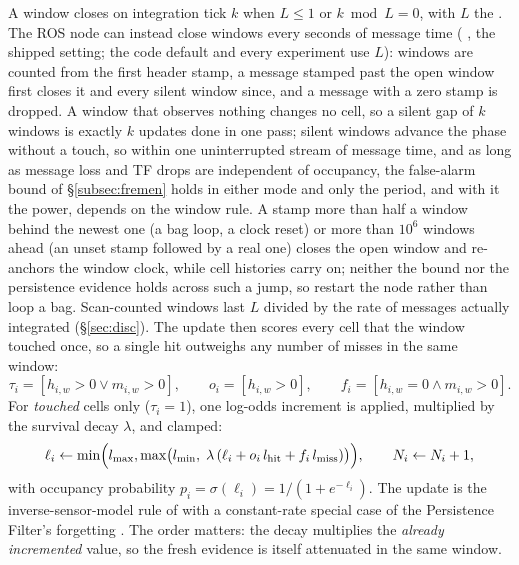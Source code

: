 A window closes on integration tick $k$ when $L\le 1$ or $k \bmod L=0$, with $L$ the . The ROS node can instead close windows every  seconds of message time ( , the shipped setting; the code default and every experiment use $L$): windows are counted from the first header stamp, a message stamped past the open window first closes it and every silent window since, and a message with a zero stamp is dropped. A window that observes nothing changes no cell, so a silent gap of $k$ windows is exactly $k$ updates done in one pass; silent windows advance the phase without a touch, so within one uninterrupted stream of message time, and as long as message loss and TF drops are independent of occupancy, the false-alarm bound of \S\ref{subsec:fremen} holds in either mode and only the period, and with it the power, depends on the window rule. A stamp more than half a window behind the newest one (a bag loop, a clock reset) or more than $10^6$ windows ahead (an unset stamp followed by a real one) closes the open window and re-anchors the window clock, while cell histories carry on; neither the bound nor the persistence evidence holds across such a jump, so restart the node rather than loop a bag. Scan-counted windows last $L$ divided by the rate of messages actually integrated (\S\ref{sec:disc}). The update then scores every cell that the window touched once, so a single hit outweighs any number of misses in the same window:
\begin{equation}\label{eq:score}
  \tau_{i}=[h_{i,w}>0\lor m_{i,w}>0],\qquad o_{i}=[h_{i,w}>0],\qquad f_{i}=[h_{i,w}=0\land m_{i,w}>0].
\end{equation}
For \emph{touched} cells only ($\tau_i=1$), one log-odds increment is applied, multiplied by the survival decay $\lambda$, and clamped:
\begin{equation}\label{eq:logodds}
  \ell_i\leftarrow\min\!\Big(l_{\max},\max\!\big(l_{\min},\;\lambda\,(\ell_i+o_i\,l_{\mathrm{hit}}+f_i\,l_{\mathrm{miss}})\big)\Big),\qquad N_i\leftarrow N_i+1,
\end{equation}
with occupancy probability $p_i=\sigma(\ell_i)=1/(1+e^{-\ell_i})$. The update is the inverse-sensor-model rule of \citet{thrun2005probabilistic} with a constant-rate special case of the Persistence Filter's forgetting \citep{rosen2016persistence}. The order matters: the decay multiplies the \emph{already incremented} value, so the fresh evidence is itself attenuated in the same window.

